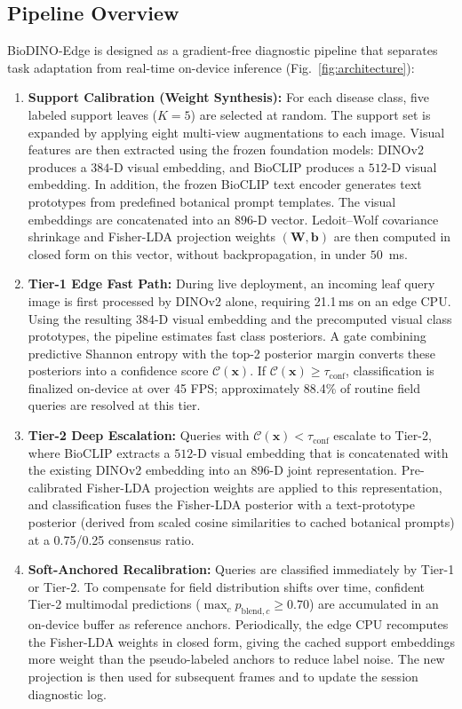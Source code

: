 \documentclass[conference]{IEEEtran}
\begin{document}
\subsection{Pipeline Overview}
\label{sec:pipeline_overview}
BioDINO-Edge is designed as a gradient-free diagnostic pipeline that separates task adaptation from real-time on-device inference (Fig.~\ref{fig:architecture}):
\begin{enumerate}
    \setlength{\itemsep}{3pt}
    \item[\textbf{1)}] \textbf{Support Calibration (Weight Synthesis):} For each disease class, five labeled support leaves ($K=5$) are selected at random. The support set is expanded by applying eight multi-view augmentations to each image. Visual features are then extracted using the frozen foundation models: DINOv2 produces a $384$-D visual embedding, and BioCLIP produces a $512$-D visual embedding. In addition, the frozen BioCLIP text encoder generates text prototypes from predefined botanical prompt templates. The visual embeddings are concatenated into an $896$-D vector. Ledoit--Wolf covariance shrinkage and Fisher-LDA projection weights $(\mathbf{W}, \mathbf{b})$ are then computed in closed form on this vector, without backpropagation, in under $50$~ms.
    \item[\textbf{2)}] \textbf{Tier-1 Edge Fast Path:} During live deployment, an incoming leaf query image is first processed by DINOv2 alone, requiring 21.1\,ms on an edge CPU. Using the resulting $384$-D visual embedding and the precomputed visual class prototypes, the pipeline estimates fast class posteriors. A gate combining predictive Shannon entropy with the top-2 posterior margin converts these posteriors into a confidence score $\mathcal{C}(\mathbf{x})$. If $\mathcal{C}(\mathbf{x}) \ge \tau_{\text{conf}}$, classification is finalized on-device at over 45 FPS; approximately 88.4\% of routine field queries are resolved at this tier.
    \item[\textbf{3)}] \textbf{Tier-2 Deep Escalation:} Queries with $\mathcal{C}(\mathbf{x}) < \tau_{\text{conf}}$ escalate to Tier-2, where BioCLIP extracts a $512$-D visual embedding that is concatenated with the existing DINOv2 embedding into an $896$-D joint representation. Pre-calibrated Fisher-LDA projection weights are applied to this representation, and classification fuses the Fisher-LDA posterior with a text-prototype posterior (derived from scaled cosine similarities to cached botanical prompts) at a 0.75/0.25 consensus ratio.
    \item[\textbf{4)}] \textbf{Soft-Anchored Recalibration:} Queries are classified immediately by Tier-1 or Tier-2. To compensate for field distribution shifts over time, confident Tier-2 multimodal predictions ($\max_c p_{\text{blend}, c} \ge 0.70$) are accumulated in an on-device buffer as reference anchors. Periodically, the edge CPU recomputes the Fisher-LDA weights in closed form, giving the cached support embeddings more weight than the pseudo-labeled anchors to reduce label noise. The new projection is then used for subsequent frames and to update the session diagnostic log.
\end{enumerate}
\end{document}
